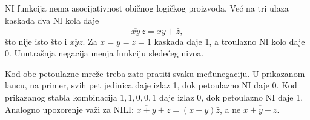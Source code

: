 
NI funkcija nema asocijativnost običnog logičkog proizvoda. Već na tri ulaza kaskada dva NI kola daje
\[
\overline{\overline{xy}\,z}=xy+\bar z,
\]
što nije isto što i \(\overline{xyz}\). Za \(x=y=z=1\) kaskada daje 1, a troulazno NI kolo daje 0. Unutrašnja negacija menja funkciju sledećeg nivoa.

Kod obe petoulazne mreže treba zato pratiti svaku međunegaciju. U prikazanom lancu, na primer, svih pet jedinica daje izlaz 1, dok petoulazno NI daje 0. Kod prikazanog stabla kombinacija \(1,1,0,0,1\) daje izlaz 0, dok petoulazno NI daje 1. Analogno upozorenje važi za NILI: \(\overline{\overline{x+y}+z}=(x+y)\bar z\), a ne \(\overline{x+y+z}\).

